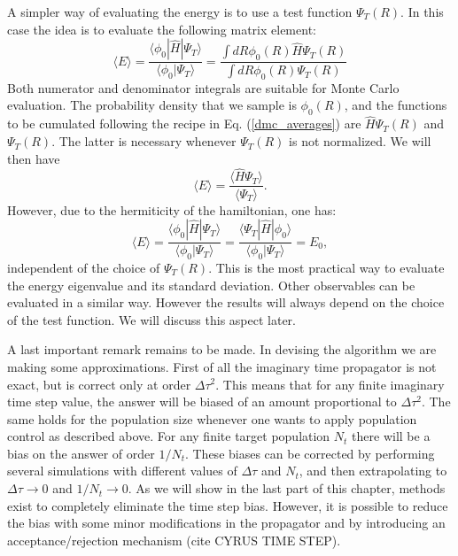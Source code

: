 A simpler way of evaluating the energy is to use a test function $\Psi_T(R)$. In this case the idea is
to evaluate the following matrix element:
\begin{equation}
\langle E\rangle =\frac{\langle \phi_0|\hat{H}|\Psi_T\rangle}{\langle \phi_0|\Psi_T\rangle}=\frac{\int dR \phi_0(R)\hat{H}\Psi_T(R)}{\int dR \phi_0(R)\Psi_T(R)}
\end{equation}
Both numerator and denominator integrals are suitable for Monte Carlo evaluation.
The probability density that we sample is $\phi_0(R)$, and the functions to be cumulated following the recipe in Eq. (\ref{dmc_averages}) are $\hat{H}\Psi_T(R)$ and $\Psi_T(R)$. The latter is necessary whenever $\Psi_T(R)$ is not normalized. We will then have
\begin{equation}
\label{Eq._dmc_ave}
\langle E\rangle=\frac{\langle \hat{H}\Psi_T\rangle}{\langle \Psi_T\rangle}.
\end{equation}
However, due to the hermiticity of the hamiltonian, one has:
\begin{equation}
\langle E\rangle =\frac{\langle \phi_0|\hat{H}|\Psi_T\rangle}{\langle \phi_0|\Psi_T\rangle}=\frac{\langle \Psi_T|\hat{H}|\phi_0\rangle}{\langle \phi_0|\Psi_T\rangle}=E_0,
\end{equation}
independent of the choice of $\Psi_T(R)$. This is the most practical way to evaluate the energy eigenvalue and its standard deviation. Other observables can be evaluated in a similar way. However the results will always depend on the choice of the test function. We will discuss this aspect later.

A last important remark remains to be made. In devising the algorithm we are making some approximations. First of all the imaginary time propagator is not exact, but is correct only at order $\Delta\tau^2$. This means that for any finite imaginary time step value, the answer will be biased of an amount proportional to $\Delta\tau^2$. The same holds for the population size whenever one wants to apply population control as described above. For any finite target population $N_t$ there will be a bias on the answer of order $1/N_t$. These biases can be corrected by performing several simulations with different values of $\Delta\tau$ and $N_t$, and then extrapolating to $\Delta\tau\rightarrow 0$ and $1/N_t\rightarrow 0$. As we will show in the last part of this chapter, methods exist to completely eliminate the time step bias. However, it is possible to reduce the bias with some minor modifications in the propagator and by introducing an acceptance/rejection mechanism (cite CYRUS TIME STEP).
